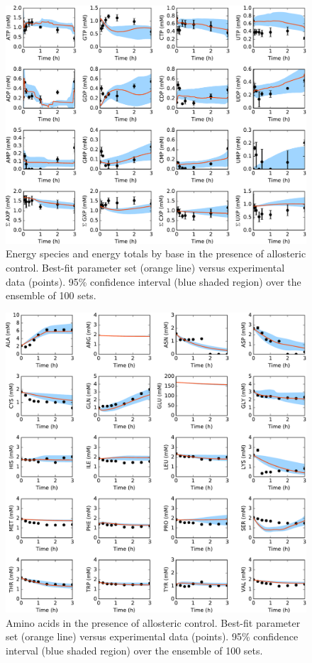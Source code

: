 \documentclass[12pt]{article}
\begin{document}
\begin{figure}[ht]
\centering
\includegraphics[width=1.00\textwidth]{./Figures/Fig_2_Energy.pdf}
\caption{Energy species and energy totals by base in the presence of allosteric control. Best-fit parameter set (orange line) versus experimental data (points). 95\% confidence interval (blue shaded region) over the ensemble of 100 sets.}
\label{fig:Energy}
\end{figure}

\begin{figure}[ht]
\centering
\includegraphics[width=1.00\textwidth]{./Figures/Fig_3_Amino.pdf}
\caption{Amino acids in the presence of allosteric control. Best-fit parameter set (orange line) versus experimental data (points). 95\% confidence interval (blue shaded region) over the ensemble of 100 sets.}
\label{fig:Amino}
\end{figure}
\end{document}
